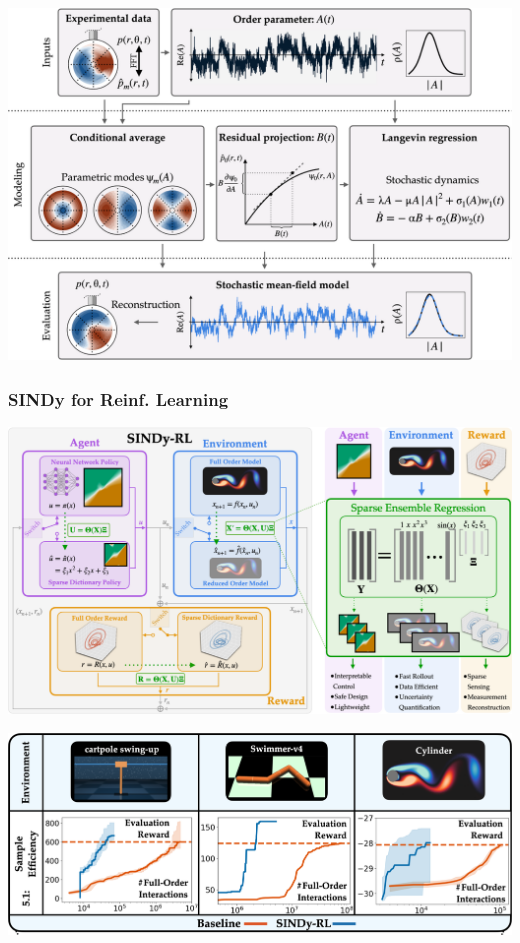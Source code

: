 \documentclass[aspectratio=169,compress,12pt]{beamer}
\begin{document}
\begin{frame}
    \vfill
    \centering
    \includegraphics[height=.9\textheight]{imgs/langevin_regression_five.png}
    \vfill
\end{frame}

\begin{frame}
    \frametitle{SINDy for Reinf. Learning}
    \vfill
    \centering
    \includegraphics[width=.8\textwidth]{imgs/sindy_rl_one.png}
    \vfill
\end{frame}

\begin{frame}
    \vfill
    \centering
    \includegraphics[width=\textwidth]{imgs/sindy_rl_two.png}
    \vfill
\end{frame}
\end{document}
